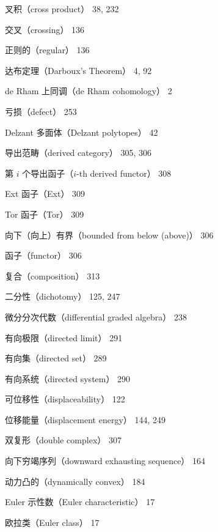 {\noindent 叉积（cross product） 38, 232\par
\noindent 交叉（crossing） 136\par
\noindent\hspace*{1.5em}正则的（regular） 136\par
\noindent 达布定理（Darboux's Theorem） 4, 92\par
\noindent de Rham 上同调（de Rham cohomology） 2\par
\noindent 亏损（defect） 253\par
\noindent Delzant 多面体（Delzant polytopes） 42\par
\noindent 导出范畴（derived category） 305, 306\par
\noindent\hspace*{1.5em}第 $i$ 个导出函子（$i$-th derived functor） 308\par
\noindent\hspace*{1.5em}Ext 函子（Ext） 309\par
\noindent\hspace*{1.5em}Tor 函子（Tor） 309\par
\noindent\hspace*{1.5em}向下（向上）有界（bounded from below (above)） 306\par
\noindent\hspace*{1.5em}函子（functor） 306\par
\noindent\hspace*{3em}复合（composition） 313\par
\noindent 二分性（dichotomy） 125, 247\par
\noindent 微分分次代数（differential graded algebra） 238\par
\noindent 有向极限（directed limit） 291\par
\noindent 有向集（directed set） 289\par
\noindent 有向系统（directed system） 290\par
\noindent 可位移性（displaceability） 122\par
\noindent 位移能量（displacement energy） 144, 249\par
\noindent 双复形（double complex） 307\par
\noindent 向下穷竭序列（downward exhausting sequence） 164\par
\noindent 动力凸的（dynamically convex） 184\par
\noindent Euler 示性数（Euler characteristic） 17\par
\noindent 欧拉类（Euler class） 17\par
}
